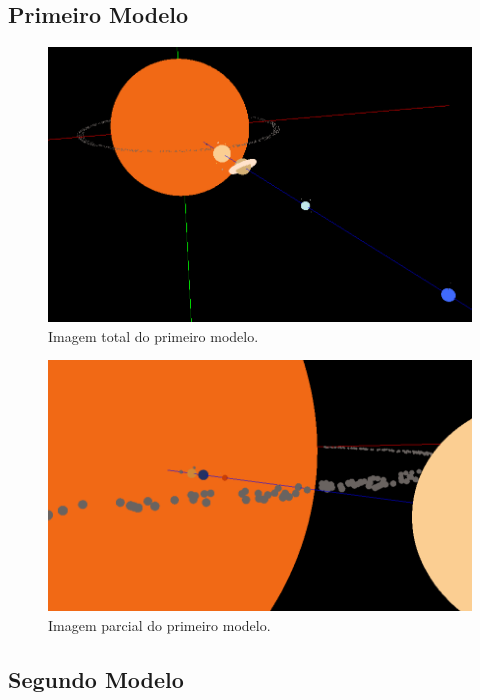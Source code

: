 \documentclass[a4paper]{article}
\begin{document}
\newpage

\subsection{Primeiro Modelo}

\begin{figure}[H]
\centering
\includegraphics[scale=0.4]{modelo1_1.png}
\caption{Imagem total do primeiro modelo.}
\label{img:modelo1_1}
\end{figure}

\begin{figure}[H]
\centering
\includegraphics[scale=0.4]{modelo1_2.png}
\caption{Imagem parcial do primeiro modelo.}
\label{img:modelo1_2}
\end{figure}


\newpage

\subsection{Segundo Modelo}
\end{document}
